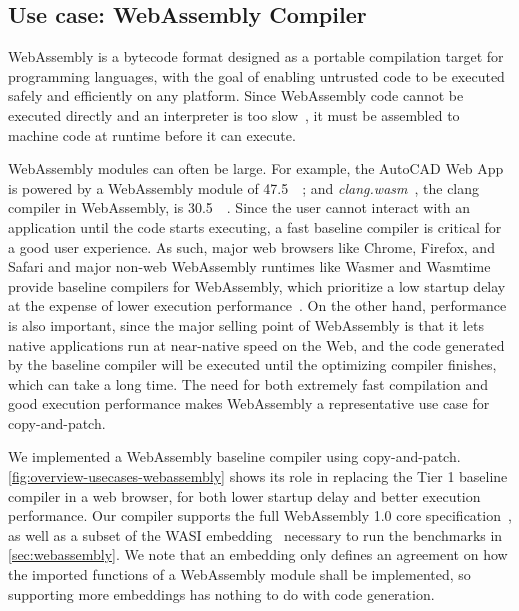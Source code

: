 \documentclass[acmsmall,nonacm,screen]{acmart}\settopmatter{printfolios=true,printccs=true,printacmref=false}
\newcommand{\figref}[1]{\autoref{#1}}
\newcommand{\secref}[1]{\autoref{#1}}
\newcommand{\cp}{copy-and-patch}
\begin{document}
\subsection{Use case: WebAssembly Compiler}

WebAssembly is a bytecode format designed as a portable compilation target for programming languages, with the goal of enabling untrusted code to be executed safely and efficiently on any platform. Since WebAssembly code cannot be executed directly and an interpreter is too slow~\cite{liftoffBlog}, it must be assembled to machine code at runtime before it can execute. 

WebAssembly modules can often be large. For example, the AutoCAD Web App~\cite{autocadWebApp} is powered by a WebAssembly module of \SI{47.5}{\mega\byte}; and \textit{clang.wasm}~\cite{clangDotWasm}, the clang compiler in WebAssembly, is \SI{30.5}{\mega\byte}.  Since the user cannot interact with an application until the code starts executing, a fast baseline compiler is critical for a good user experience. As such, major web browsers like Chrome, Firefox, and Safari and major non-web WebAssembly runtimes like Wasmer and Wasmtime provide baseline compilers for WebAssembly, which prioritize a low startup delay at the expense of lower execution performance~\cite{liftoffBlog, firefoxWasmBaselineBlog1, firefoxWasmBaselineBlog2, safariWasmBlog, wasmerSinglepassJit, wasmtimeLightbeam}. On the other hand, performance is also important, since the major selling point of WebAssembly is that it lets native applications run at near-native speed on the Web, and the code generated by the baseline compiler will be executed until the optimizing compiler finishes, which can take a long time. The need for both extremely fast compilation and good execution performance makes WebAssembly a representative use case for \cp{}.

We implemented a WebAssembly baseline compiler using \cp{}. \figref{fig:overview-usecases-webassembly} shows its role in replacing the Tier 1 baseline compiler in a web browser, for both lower startup delay and better execution performance. Our compiler supports the full WebAssembly 1.0 core specification~\cite{wasmCoreSpec}, as well as a subset of the WASI embedding~\cite{wasmWasiEmbedding} necessary to run the benchmarks in \secref{sec:webassembly}. We note that an embedding only defines an agreement on how the imported functions of a WebAssembly module shall be implemented, so supporting more embeddings has nothing to do with code generation.
\end{document}
